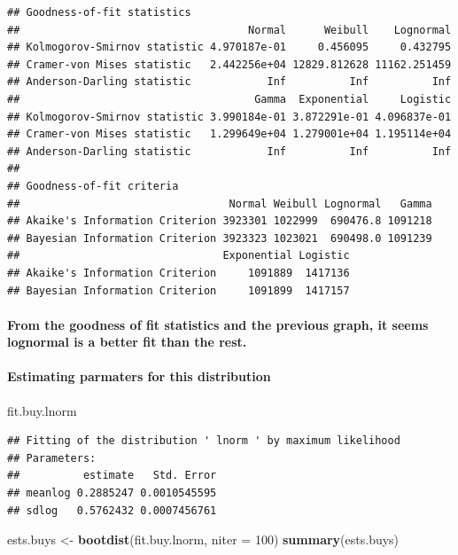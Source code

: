 \documentclass[]{article}
\newenvironment{Shaded}{\begin{snugshade}}{\end{snugshade}}
\newcommand{\KeywordTok}[1]{\textcolor[rgb]{0.13,0.29,0.53}{\textbf{#1}}}
\newcommand{\DataTypeTok}[1]{\textcolor[rgb]{0.13,0.29,0.53}{#1}}
\newcommand{\DecValTok}[1]{\textcolor[rgb]{0.00,0.00,0.81}{#1}}
\newcommand{\StringTok}[1]{\textcolor[rgb]{0.31,0.60,0.02}{#1}}
\newcommand{\NormalTok}[1]{#1}
\let\oldparagraph\paragraph
\renewcommand{\paragraph}[1]{\oldparagraph{#1}\mbox{}}
\begin{document}
\begin{verbatim}
## Goodness-of-fit statistics
##                                    Normal      Weibull    Lognormal
## Kolmogorov-Smirnov statistic 4.970187e-01     0.456095     0.432795
## Cramer-von Mises statistic   2.442256e+04 12829.812628 11162.251459
## Anderson-Darling statistic            Inf          Inf          Inf
##                                     Gamma  Exponential     Logistic
## Kolmogorov-Smirnov statistic 3.990184e-01 3.872291e-01 4.096837e-01
## Cramer-von Mises statistic   1.299649e+04 1.279001e+04 1.195114e+04
## Anderson-Darling statistic            Inf          Inf          Inf
## 
## Goodness-of-fit criteria
##                                 Normal Weibull Lognormal   Gamma
## Akaike's Information Criterion 3923301 1022999  690476.8 1091218
## Bayesian Information Criterion 3923323 1023021  690498.0 1091239
##                                Exponential Logistic
## Akaike's Information Criterion     1091889  1417136
## Bayesian Information Criterion     1091899  1417157
\end{verbatim}

\paragraph{From the goodness of fit statistics and the previous graph,
it seems lognormal is a better fit than the
rest.}\label{from-the-goodness-of-fit-statistics-and-the-previous-graph-it-seems-lognormal-is-a-better-fit-than-the-rest.}

\paragraph{Estimating parmaters for this
distribution}\label{estimating-parmaters-for-this-distribution}

\begin{Shaded}
\begin{Highlighting}[]
\NormalTok{fit.buy.lnorm}
\end{Highlighting}
\end{Shaded}

\begin{verbatim}
## Fitting of the distribution ' lnorm ' by maximum likelihood 
## Parameters:
##          estimate   Std. Error
## meanlog 0.2885247 0.0010545595
## sdlog   0.5762432 0.0007456761
\end{verbatim}

\begin{Shaded}
\begin{Highlighting}[]
\NormalTok{ests.buys <-}\StringTok{ }\KeywordTok{bootdist}\NormalTok{(fit.buy.lnorm, }\DataTypeTok{niter =} \DecValTok{100}\NormalTok{)}
\KeywordTok{summary}\NormalTok{(ests.buys)}
\end{Highlighting}
\end{Shaded}
\end{document}

